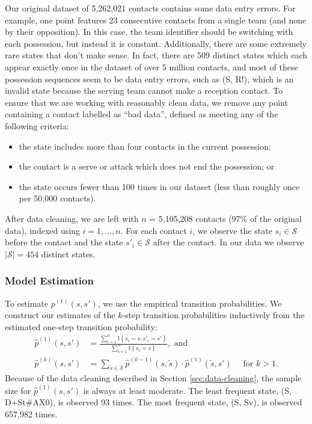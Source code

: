 \documentclass[USenglish]{article}
\theoremstyle{dgthm}
\theoremstyle{dgdef}
\begin{document}
Our original dataset of 5,262,021 contacts contains some data entry errors. For example, one point features 23 consecutive contacts from a single team (and none by their opposition). In this case, the team identifier should be switching with each possession, but instead it is constant. Additionally, there are some extremely rare states that don't make sense. In fact, there are 509 distinct states which each appear exactly once in the dataset of over 5 million contacts, and most of these possession sequences seem to be data entry errors, such as (S, R!), which is an invalid state because the serving team cannot make a reception contact. To ensure that we are working with reasonably clean data, we remove any point containing a contact labelled as ``bad data'', defined as meeting any of the following criteria:
\begin{itemize}
  \item the state includes more than four contacts in the current possession;
  \item the contact is a serve or attack which does not end the possession; or
  \item the state occurs fewer than 100 times in our dataset (less than roughly once per 50,000 contacts).
\end{itemize}

After data cleaning, we are left with $n$ = 5,105,208 contacts (97\% of the original data), indexed using $i = 1, ..., n$. For each contact $i$, we observe the state $s_i \in \mathcal{S}$ before the contact and the state $s'_i \in \mathcal{S}$ after the contact. In our data we observe $|\mathcal{S}| = 454$ distinct states.

\subsubsection{Model Estimation}

To estimate $p^{(1)}(s, s')$, we use the empirical transition probabilities. We construct our estimates of the $k$-step transition probabilities inductively from the estimated one-step transition probability:
\begin{align}
  \label{eqn:transition-prob}
  \hat p^{(1)}(s, s') &= \frac
    {\sum_{i = 1}^n \mathbb{I}\left\{s_i = s, s'_i = s'\right\}}
    {\sum_{i = 1}^n \mathbb{I}\left\{s_i = s\right\}},\mbox{ and}\\
  \hat p^{(k)}(s, s') &= \sum_{\tilde s \in \mathcal{S}} \hat p^{(k-1)}(s, \tilde s) \cdot \hat p^{(1)}(\tilde s, s') \quad \mbox{ for }k > 1.
\end{align}
Because of the data cleaning described in Section \ref{sec:data-cleaning}, the sample size for $\hat p^{(1)}(s, s')$ is always at least moderate. The least frequent state, (S, D+St\#AX0), is observed 93 times. The most frequent state, (S, Sv), is observed 657,982 times.
\end{document}
